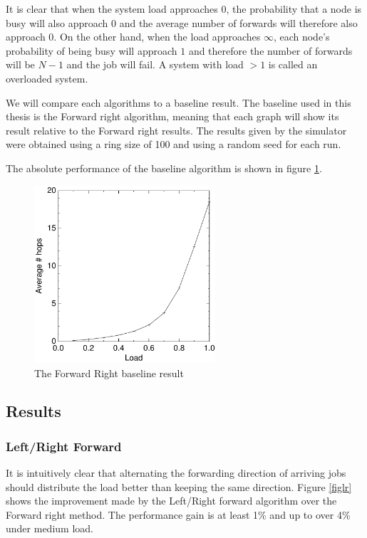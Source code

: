 \documentclass[10pt,a4paper]{article}
\begin{document}
It is clear that when the system load approaches $0$, the probability that a node is busy will also approach $0$ and the average number of forwards will therefore also approach $0$. On the other hand, when the load approaches $\infty$, each node's probability of being busy will approach $1$ and therefore the number of forwards will be $N-1$ and the job will fail. A system with load $> 1$ is called an overloaded system.

We will compare each algorithms to a baseline result. The baseline used in this thesis is the Forward right algorithm, meaning that each graph will show its result relative to the Forward right results. The results given by the simulator were obtained using a ring size of 100 and using a random seed for each run.

The absolute performance of the baseline algorithm is shown in figure \ref{baseline}.

\begin{figure}[h!tb]
\centering
\includegraphics[width=0.6\textwidth]{data/right.pdf}
\caption{The Forward Right baseline result}
\label{baseline}
\end{figure}

\subsection{Results}
\label{simresults}

\subsubsection*{Left/Right Forward}
It is intuitively clear that alternating the forwarding direction of arriving jobs should distribute the load better than keeping the same direction. Figure \ref{figlr} shows the improvement made by the Left/Right forward algorithm over the Forward right method. The performance gain is at least 1\% and up to over 4\% under medium load.
\end{document}
